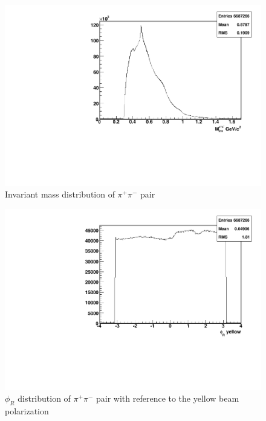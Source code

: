 \documentclass[abstract = on,listof=totoc, bibliography=totoc]{scrreprt}
\newcommand{\phir}{\phi_{R}}
\newcommand{\pip}{\pi^+}
\newcommand{\pim}{\pi^-}
\newcommand{\pair}{$\pip\pim$ }
\begin{document}
\begin{figure}
\begin{center}
\includegraphics[width = .8\textwidth]{hInvarM}
\caption[Invariant mass distribution of \pair pair]{Invariant mass distribution of \pair pair}
\label{fig:invarM}
\end{center}
\end{figure}

\begin{figure}
\begin{center}
\includegraphics[width = .8\textwidth]{hPhiRy}
\caption[$\phir$ distribution of \pair pair with reference to the yellow beam polarization]{$\phir$ distribution of \pair pair with reference to the yellow beam polarization}
\label{fig:phiry}
\end{center}
\end{figure}
\end{document}
